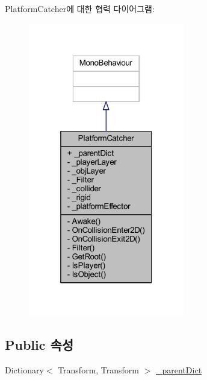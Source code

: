 Platform\+Catcher에 대한 협력 다이어그램\+:\nopagebreak
\begin{figure}[H]
\begin{center}
\leavevmode
\includegraphics[width=193pt]{dc/db1/class_platform_catcher__coll__graph}
\end{center}
\end{figure}
\subsection*{Public 속성}
\begin{DoxyCompactItemize}
\item 
Dictionary$<$ Transform, Transform $>$ \mbox{\hyperlink{class_platform_catcher_a6b2f5503fc0534fe9898c6bf3b32ec75}{\+\_\+parent\+Dict}}
\end{DoxyCompactItemize}
